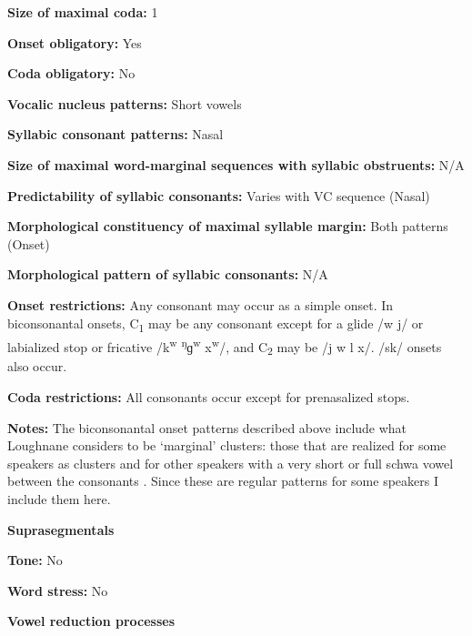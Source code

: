 \textbf{Size of maximal coda:} 1



\textbf{Onset obligatory:} Yes



\textbf{Coda obligatory:} No



\textbf{Vocalic nucleus patterns:} Short vowels



\textbf{Syllabic consonant patterns:} Nasal



\textbf{Size of maximal word{}-marginal sequences with syllabic obstruents:} N/A



\textbf{Predictability of syllabic consonants:} Varies with VC sequence (Nasal)



\textbf{Morphological constituency of maximal syllable margin:} Both patterns (Onset)



\textbf{Morphological pattern of syllabic consonants:} N/A



\textbf{Onset restrictions:} Any consonant may occur as a simple onset. In biconsonantal onsets, C\textsubscript{1} may be any consonant except for a glide /w j/ or labialized stop or fricative /k\textsuperscript{w} \textsuperscript{ŋ}ɡ\textsuperscript{w} x\textsuperscript{w}/, and C\textsubscript{2} may be /j w l x/. /sk/ onsets also occur.



\textbf{Coda restrictions:} All consonants occur except for prenasalized stops.



\textbf{Notes:} The biconsonantal onset patterns described above include what Loughnane considers to be ‘marginal’ clusters: those that are realized for some speakers as clusters and for other speakers with a very short or full schwa vowel between the consonants \citep[64-5]{Loughnane2009}. Since these are regular patterns for some speakers I include them here.



\textbf{Suprasegmentals}



\textbf{Tone:} No



\textbf{Word stress:} No



\textbf{Vowel reduction processes}




